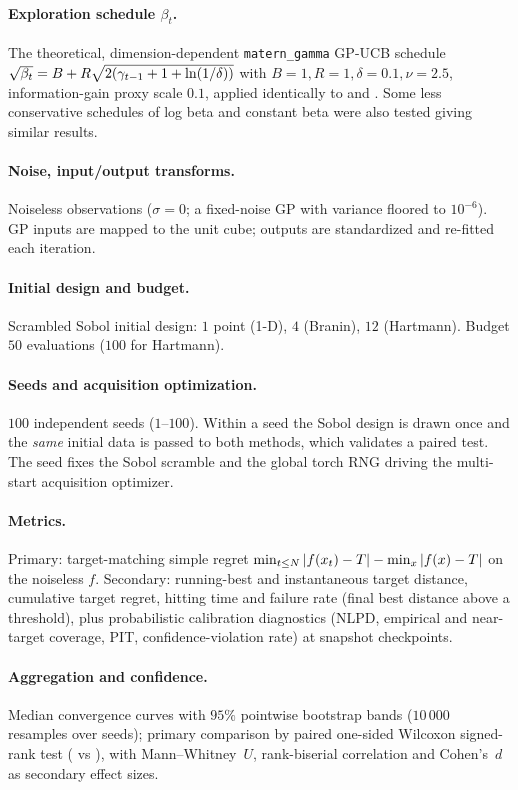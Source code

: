 \paragraph{Exploration schedule $\beta_t$.}
The theoretical, dimension-dependent \texttt{matern\_gamma} GP-UCB schedule
$\sqrt{\beta_t}=B+R\sqrt{2(\gamma_{t-1}+1+\ln(1/\delta))}$ with
$B=1,R=1,\delta=0.1,\nu=2.5$, information-gain proxy scale $0.1$, applied
identically to \RIGHT{} and \WRONG. Some less conservative schedules of log beta and constant beta were also tested giving similar results.

\paragraph{Noise, input/output transforms.}
Noiseless observations ($\sigma=0$; a fixed-noise GP with variance floored to
$10^{-6}$). GP inputs are mapped to the unit cube; outputs are standardized and
re-fitted each iteration.

\paragraph{Initial design and budget.}
Scrambled Sobol initial design: $1$ point (1-D), $4$ (Branin), $12$ (Hartmann).
Budget $50$ evaluations ($100$ for Hartmann).

\paragraph{Seeds and acquisition optimization.}
$100$ independent seeds ($1$--$100$). Within a seed the Sobol design is drawn once
and the \emph{same} initial data is passed to both methods, which validates a
paired test. The seed fixes the Sobol scramble and the global torch RNG driving
the multi-start acquisition optimizer.

\paragraph{Metrics.}
Primary: target-matching simple regret
$\min_{t\le N}\left\lvert f(x_t)-T\right\rvert-\min_x\left\lvert f(x)-T\right\rvert$ on the noiseless $f$. Secondary:
running-best and instantaneous target distance, cumulative target regret, hitting
time and failure rate (final best distance above a threshold), plus probabilistic
calibration diagnostics (NLPD, empirical and near-target coverage, PIT,
confidence-violation rate) at snapshot checkpoints.

\paragraph{Aggregation and confidence.}
Median convergence curves with $95\%$ pointwise bootstrap bands ($10\,000$
resamples over seeds); primary comparison by paired one-sided Wilcoxon
signed-rank test (\RIGHT{} vs \WRONG), with Mann--Whitney~$U$, rank-biserial
correlation and Cohen's~$d$ as secondary effect sizes.


